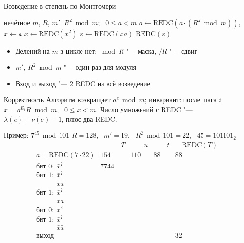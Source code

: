\documentclass{ca-slides}
\begin{document}
\begin{canvasframe}{Возведение в степень по Монтгомери}
  \begin{algorithmic}[1]
    \Require нечётное $m$, $R$, $m'$, $R^2 \bmod m$; \ $0 \le a < m$
    \State $\bar a \gets \mathrm{REDC}(a \cdot (R^2 \bmod m))$, \quad $\bar x \gets \bar a$
      \State $\bar x \gets \mathrm{REDC}(\bar x^2)$
       $\bar x \gets \mathrm{REDC}(\bar x \bar a)$ \EndIf
    \EndFor
    \State \Return $\mathrm{REDC}(\bar x)$
  \end{algorithmic}
  \medskip
  \begin{itemize}
    \item Делений на $m$ в цикле нет: $\bmod R$ "--- маска, $/R$ "--- сдвиг
    \item $m'$, $R^2 \bmod m$ "--- один раз для модуля
    \item Вход и выход "--- 2 REDC на всё возведение
  \end{itemize}
\end{canvasframe}

\begin{theoremframe}{Корректность}
  Алгоритм возвращает $a^e \bmod m$; инвариант: после шага $i$
  \ $\bar x = a^{E_i} R \bmod m$, \ $0 \le \bar x < m$. Число умножений с REDC "---
  $\lambda(e) + \nu(e) - 1$, плюс два REDC.
\end{theoremframe}

\begin{canvasframe}[shrink=5]{Пример: $7^{45} \bmod 101$}
  $R = 128$, \ $m' = 19$, \ $R^2 \bmod 101 = 22$, \ $45 = 101101_2$
  \renewcommand{\arraystretch}{1.12}
  \[
  \begin{array}{l|r|r|r|r}
    & \hspace{3em} T & \hspace{2em} u & \hspace{2em} t & \hspace{1em}\mathrm{REDC}(T) \\ \hline
    \bar a = \mathrm{REDC}(7 \cdot 22) & 154 & 110 & 88 & 88 \\
    \text{бит } 0:\ \bar x^2 & 7744 & & & \\
    \text{бит } 1:\ \bar x^2 & & & & \\
    \phantom{\text{бит } 1:\ }\bar x \bar a & & & & \\
    \text{бит } 1:\ \bar x^2 & & & & \\
    \phantom{\text{бит } 1:\ }\bar x \bar a & & & & \\
    \text{бит } 0:\ \bar x^2 & & & & \\
    \text{бит } 1:\ \bar x^2 & & & & \\
    \phantom{\text{бит } 1:\ }\bar x \bar a & & & & \\
    \text{выход} & & & & 32
  \end{array}
  \]
\end{canvasframe}
\end{document}
